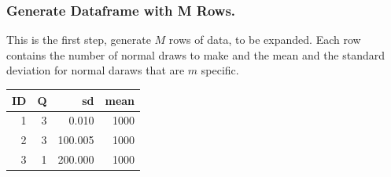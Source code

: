 \documentclass[
]{book}
\newenvironment{Shaded}{\begin{snugshade}}{\end{snugshade}}
\newcommand{\CommentTok}[1]{\textcolor[rgb]{0.56,0.35,0.01}{\textit{#1}}}
\newcommand{\DataTypeTok}[1]{\textcolor[rgb]{0.13,0.29,0.53}{#1}}
\newcommand{\DecValTok}[1]{\textcolor[rgb]{0.00,0.00,0.81}{#1}}
\newcommand{\FloatTok}[1]{\textcolor[rgb]{0.00,0.00,0.81}{#1}}
\newcommand{\KeywordTok}[1]{\textcolor[rgb]{0.13,0.29,0.53}{\textbf{#1}}}
\newcommand{\NormalTok}[1]{#1}
\newcommand{\OperatorTok}[1]{\textcolor[rgb]{0.81,0.36,0.00}{\textbf{#1}}}
\newcommand{\OtherTok}[1]{\textcolor[rgb]{0.56,0.35,0.01}{#1}}
\newcommand{\StringTok}[1]{\textcolor[rgb]{0.31,0.60,0.02}{#1}}
\begin{document}
\hypertarget{generate-dataframe-with-m-rows.}{%
\subsubsection{Generate Dataframe with M Rows.}\label{generate-dataframe-with-m-rows.}}

This is the first step, generate \(M\) rows of data, to be expanded. Each row contains the number of normal draws to make and the mean and the standard deviation for normal daraws that are \(m\) specific.

\begin{Shaded}
\end{Shaded}

\begin{table}[!h]
\centering
\begin{tabular}{r|r|r|r}
\hline
ID & Q & sd & mean\\
\hline
\rowcolor{gray!6}  1 & 3 & 0.010 & 1000\\
\hline
2 & 3 & 100.005 & 1000\\
\hline
\rowcolor{gray!6}  3 & 1 & 200.000 & 1000\\
\hline
\end{tabular}
\end{table}
\end{document}
